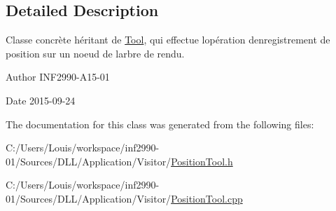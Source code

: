 \subsection{Detailed Description}
Classe concrète héritant de \hyperlink{class_tool}{Tool}, qui effectue l\textquotesingle{}opération d\textquotesingle{}enregistrement de position sur un noeud de l\textquotesingle{}arbre de rendu. 

\begin{DoxyAuthor}{Author}
I\+N\+F2990-\/\+A15-\/01 
\end{DoxyAuthor}
\begin{DoxyDate}{Date}
2015-\/09-\/24 
\end{DoxyDate}


The documentation for this class was generated from the following files\+:\begin{DoxyCompactItemize}
\item 
C\+:/\+Users/\+Louis/workspace/inf2990-\/01/\+Sources/\+D\+L\+L/\+Application/\+Visitor/\hyperlink{_position_tool_8h}{Position\+Tool.\+h}\item 
C\+:/\+Users/\+Louis/workspace/inf2990-\/01/\+Sources/\+D\+L\+L/\+Application/\+Visitor/\hyperlink{_position_tool_8cpp}{Position\+Tool.\+cpp}\end{DoxyCompactItemize}
